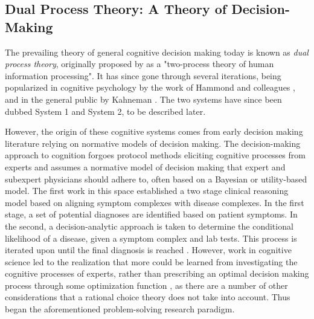 
\subsection{Dual Process Theory: A Theory of Decision-Making}

The prevailing theory of general cognitive decision making today is known as \emph{dual process theory}, originally proposed by \citet{shiffrinControlledAutomaticHuman1977} as a "two-process theory of human information processing". It has since gone through several iterations, being popularized in cognitive psychology by the work of Hammond and colleagues \citep{epsteinIntegrationCognitivePsychodynamic1994, hammondHumanJudgementSocial1996}, and in the general public by Kahneman \citep{kahneman2011thinking}. The two systems have since been dubbed System 1 and System 2, to be described later. 

However, the origin of these cognitive systems comes from early decision making literature relying on normative models of decision making. The decision-making approach to cognition forgoes protocol methods eliciting cognitive processes from experts and assumes a normative model of decision making that expert and subexpert physicians should adhere to, often based on a Bayesian or utility-based model. The first work in this space established a two stage clinical reasoning model based on aligning symptom complexes with disease complexes. In the first stage, a set of potential diagnoses are identified based on patient symptoms. In the second, a decision-analytic approach is taken to determine the conditional likelihood of a disease, given a symptom complex and lab tests. This process is iterated upon until the final diagnosis is reached \citep{ledley1959reasoning}. However, work in cognitive science led to the realization that more could be learned from investigating the cognitive processes of experts, rather than prescribing an optimal decision making process through some optimization function \citep{patelEmergingParadigmsCognition2002}, as there are a number of other considerations that a rational choice theory does not take into account. Thus began the aforementioned problem-solving research paradigm. 

